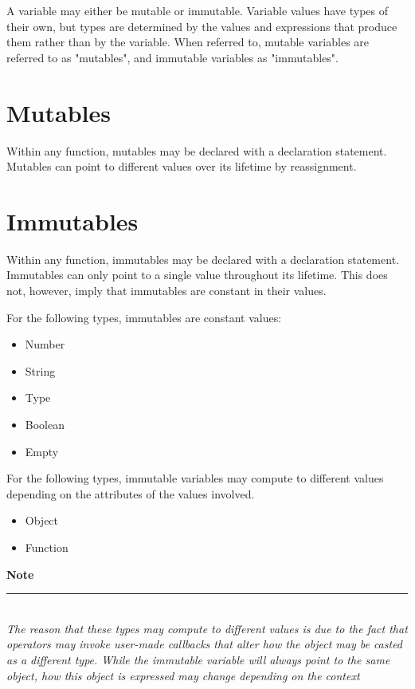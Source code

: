 \documentclass[12pt,letterpaper]{report}
\newcommand{\noteline}{\noindent\textbf{Note}\\\noindent\rule{5cm}{0.4pt}\\}
\begin{document}
A variable may either be mutable or immutable. Variable values have types of their own, but 
types are determined by the values and expressions that produce them rather than by the 
variable. When referred to, mutable variables are referred to as "mutables", and immutable variables as "immutables".

\section{Mutables}

Within any function, mutables may be declared with a declaration statement.
Mutables can point to different values over its lifetime by reassignment.
    




\section{Immutables}
Within any function, immutables may be declared with a declaration statement.
Immutables can only point to a single value throughout its lifetime. This does not, however,
imply that immutables are constant in their values. 

For the following types, immutables are constant values:
\begin{itemize}
  \item Number 
  \item String 
  \item Type
  \item Boolean
  \item Empty 
\end{itemize}

For the following types, immutable variables may compute to different values depending on the attributes of the values involved.
\begin{itemize}
  \item Object 
  \item Function  
\end{itemize}




\noteline
\textit{
The reason that these types may compute to different values is due to the fact that operators may invoke user-made callbacks that 
alter how the object may be casted as a different type. While the immutable variable will always point to 
the same object, how this object is expressed may change depending on the context
}
\end{document}
